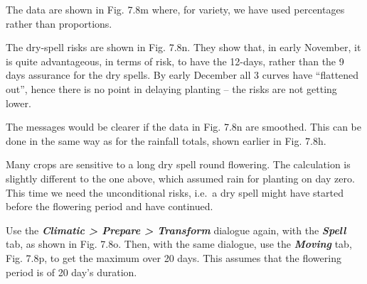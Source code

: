 \documentclass[
  letterpaper,
  DIV=11,
  numbers=noendperiod]{scrreprt}
\begin{document}
The data are shown in Fig. 7.8m where, for variety, we have used
percentages rather than proportions.

The dry-spell risks are shown in Fig. 7.8n. They show that, in early
November, it is quite advantageous, in terms of risk, to have the
12-days, rather than the 9 days assurance for the dry spells. By early
December all 3 curves have ``flattened out'', hence there is no point in
delaying planting -- the risks are not getting lower.

The messages would be clearer if the data in Fig. 7.8n are smoothed.
This can be done in the same way as for the rainfall totals, shown
earlier in Fig. 7.8h.

Many crops are sensitive to a long dry spell round flowering. The
calculation is slightly different to the one above, which assumed rain
for planting on day zero. This time we need the unconditional risks,
i.e.~a dry spell might have started before the flowering period and have
continued.

Use the \textbf{\emph{Climatic \textgreater{} Prepare \textgreater{}
Transform}} dialogue again, with the \textbf{\emph{Spell}} tab, as shown
in Fig. 7.8o. Then, with the same dialogue, use the
\textbf{\emph{Moving}} tab, Fig. 7.8p, to get the maximum over 20 days.
This assumes that the flowering period is of 20 day's duration.
\end{document}
